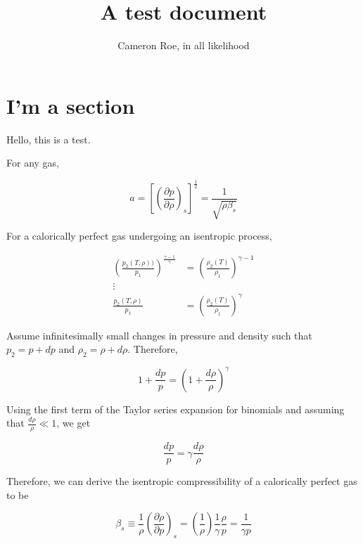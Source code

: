 \documentclass[twocolumn]{article}
\title{A test document}
\author{Cameron Roe, in all likelihood}
\begin{document}
\maketitle

\section{I'm a section}
Hello, this is a test. 


For any gas, 

\begin{equation}
    a = \left[ \left(\frac{\partial p}{\partial \rho} \right)_s \right]^{\frac{1}{2}} = \frac{1}{\sqrt{\rho \beta_s}}
\end{equation}

For a calorically perfect gas undergoing an isentropic process, 

\begin{equation}
\begin{split}
    \left(\frac{p_2(T,\rho))}{p_1}\right)^\frac{\gamma - 1}{\gamma} &= \left( \frac{\rho_2(T)}{\rho_1} \right)^{\gamma - 1} \\
    \vdots& \\ 
    \frac{p_2(T,\rho)}{p_1} &= \left(\frac{\rho_2(T)}{\rho_1} \right)^\gamma
    \end{split}
\end{equation}

Assume infinitesimally small changes in pressure and density such that $p_2 = p + dp$ and $\rho_2 = \rho + d\rho$. Therefore, 

\begin{equation}
    1 + \frac{dp}{p} = \left(1 + \frac{d\rho}{\rho}\right)^\gamma
\end{equation}

Using the first term of the Taylor series expansion for binomials and assuming that $\frac{d\rho}{\rho} \ll 1$, we get

\begin{equation}
    \frac{dp}{p} = \gamma \frac{d\rho}{\rho}
\end{equation}

Therefore, we can derive the isentropic compressibility of a calorically perfect gas to be

\begin{equation}
    \beta_s \equiv \frac{1}{\rho} \left(  \frac{\partial \rho}{\partial p}\right)_s =\left( \frac{1}{\rho}\right) \frac{1}{\gamma} \frac{\rho}{p} = \frac{1}{\gamma p} \label{eq:isentropicCompressibility}
\end{equation}
\end{document}
